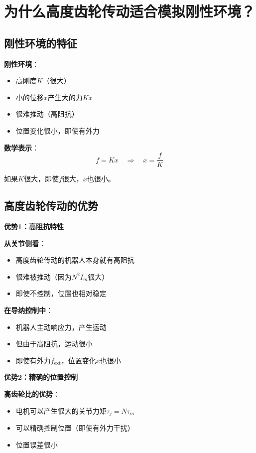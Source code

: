 \documentclass[12pt,a4paper]{article}
\begin{document}
\section{为什么高度齿轮传动适合模拟刚性环境？}

\subsection{刚性环境的特征}

\textbf{刚性环境}：
\begin{itemize}
\item 高刚度$K$（很大）
\item 小的位移$x$产生大的力$Kx$
\item 很难推动（高阻抗）
\item 位置变化很小，即使有外力
\end{itemize}

\textbf{数学表示}：
\begin{equation}
f = Kx \quad \Rightarrow \quad x = \frac{f}{K}
\end{equation}

如果$K$很大，即使$f$很大，$x$也很小。

\subsection{高度齿轮传动的优势}

\textbf{优势1：高阻抗特性}

\textbf{从关节侧看}：
\begin{itemize}
\item 高度齿轮传动的机器人本身就有高阻抗
\item 很难被推动（因为$N^2 I_m$很大）
\item 即使不控制，位置也相对稳定
\end{itemize}

\textbf{在导纳控制中}：
\begin{itemize}
\item 机器人主动响应力，产生运动
\item 但由于高阻抗，运动很小
\item 即使有外力$f_{\text{ext}}$，位置变化$x$也很小
\end{itemize}

\textbf{优势2：精确的位置控制}

\textbf{高齿轮比的优势}：
\begin{itemize}
\item 电机可以产生很大的关节力矩$\tau_j = N\tau_m$
\item 可以精确控制位置（即使有外力干扰）
\item 位置误差很小
\end{itemize}
\end{document}
